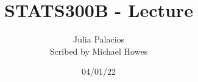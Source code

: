 




\title{STATS300B - Lecture }
\author{Julia Palacios\\ Scribed by Michael Howes}
\date{04/01/22}

\pagestyle{fancy}
\fancyhf{}


\maketitle
\tableofcontents
